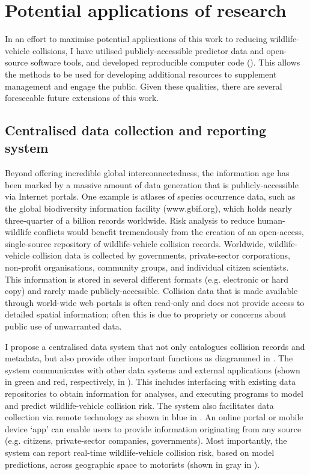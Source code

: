 \section{Potential applications of research}

In an effort to maximise potential applications of this work to reducing wildlife-vehicle collisions, I have utilised publicly-accessible predictor data and open-source software tools, and developed reproducible computer code (). This allows the methods to be used for developing additional resources to supplement management and engage the public. Given these qualities, there are several foreseeable future extensions of this work. 

\subsection{Centralised data collection and reporting system}

Beyond offering incredible global interconnectedness, the information age has been marked by a massive amount of data generation that is publicly-accessible via Internet portals. One example is atlases of species occurrence data, such as the global biodiversity information facility (www.gbif.org), which holds nearly three-quarter of a billion records worldwide. Risk analysis to reduce human-wildlife conflicts would benefit tremendously from the creation of an open-access, single-source repository of wildlife-vehicle collision records. Worldwide, wildlife-vehicle collision data is collected by governments, private-sector corporations, non-profit organisations, community groups, and individual citizen scientists. This information is stored in several different formats (e.g. electronic or hard copy) and rarely made publicly-accessible. Collision data that is made available through world-wide web portals is often read-only and does not provide access to detailed spatial information; often this is due to propriety or concerns about public use of unwarranted data.

I propose a centralised data system that not only catalogues collision records and metadata, but also provide other important functions as diagrammed in . The system communicates with other data systems and external applications (shown in green and red, respectively, in ). This includes interfacing with existing data repositories to obtain information for analyses, and executing programs to model and predict wildlife-vehicle collision risk. The system also facilitates data collection via remote technology as shown in blue in . An online portal or mobile device `app' can enable users to provide information originating from any source (e.g. citizens, private-sector companies, governments). Most importantly, the system can report real-time wildlife-vehicle collision risk, based on model predictions, across geographic space to motorists (shown in gray in ).

